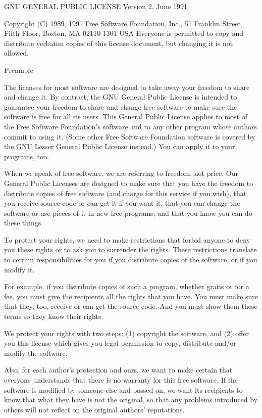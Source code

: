 \begin{DoxyCode}
GNU GENERAL PUBLIC LICENSE
Version 2, June 1991

 Copyright (C) 1989, 1991 Free Software Foundation, Inc.,
 51 Franklin Street, Fifth Floor, Boston, MA 02110-1301 USA
 Everyone is permitted to copy and distribute verbatim copies
 of this license document, but changing it is not allowed.

Preamble

  The licenses for most software are designed to take away your
freedom to share and change it.  By contrast, the GNU General Public
License is intended to guarantee your freedom to share and change free
software-to make sure the software is free for all its users.  This
General Public License applies to most of the Free Software
Foundation's software and to any other program whose authors commit to
using it.  (Some other Free Software Foundation software is covered by
the GNU Lesser General Public License instead.)  You can apply it to
your programs, too.

  When we speak of free software, we are referring to freedom, not
price.  Our General Public Licenses are designed to make sure that you
have the freedom to distribute copies of free software (and charge for
this service if you wish), that you receive source code or can get it
if you want it, that you can change the software or use pieces of it
in new free programs; and that you know you can do these things.

  To protect your rights, we need to make restrictions that forbid
anyone to deny you these rights or to ask you to surrender the rights.
These restrictions translate to certain responsibilities for you if you
distribute copies of the software, or if you modify it.

  For example, if you distribute copies of such a program, whether
gratis or for a fee, you must give the recipients all the rights that
you have.  You must make sure that they, too, receive or can get the
source code.  And you must show them these terms so they know their
rights.

  We protect your rights with two steps: (1) copyright the software, and
(2) offer you this license which gives you legal permission to copy,
distribute and/or modify the software.

  Also, for each author's protection and ours, we want to make certain
that everyone understands that there is no warranty for this free
software.  If the software is modified by someone else and passed on, we
want its recipients to know that what they have is not the original, so
that any problems introduced by others will not reflect on the original
authors' reputations.


\end{DoxyCode}
